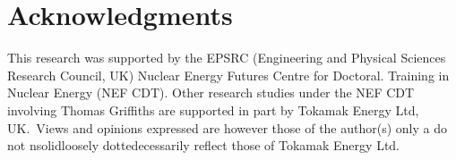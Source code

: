 \documentclass[journal]{IEEEtran}
\begin{document}
\section{Acknowledgments}
This research was supported by the EPSRC (Engineering and Physical Sciences Research Council, UK) Nuclear Energy Futures Centre for Doctoral. Training in Nuclear Energy (NEF CDT). Other research studies under the NEF CDT involving Thomas Griffiths are supported in part by Tokamak Energy Ltd, UK.\ Views and opinions expressed are however those of the author(s) only a do not nsolidloosely dottedecessarily reflect those of Tokamak Energy Ltd.





\begin{appendices}
    
 \end{appendices}
\end{document}

